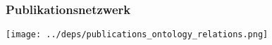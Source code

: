 \documentclass[12pt, xcolor=table]{beamer}
\begin{document}
\begin{comment}
    \begin{block}{\small{C-Rank}}
    \scriptsize{
        $sim(a,b) = 1 \quad \text{wenn } a=b$
        \newline
        sonst: \quad
        $sim(a,b)  = 
        \cfrac{c}{|L(a)||L(b)|}
        \sum_{i=1}^{|L(a)|} \sum_{j=1}^{|L(b)|} sim(L_i(a),L_j(b))$
   }
    \end{block}

\end{frame}


\begin{frame}
    \frametitle{Existierende Ähnlichkeitsmaße - zitationsbasiert III}
    \begin{block}{Weitere Beispiele}
    \begin{itemize}
        \item CC-IDF
        \item Lu et al.: Ähnlichkeit aufgrund lokaler Nachbarschaft
    \end{itemize}
    \end{block}
\end{frame}

\begin{frame}
    \frametitle{Existierende Ähnlichkeitsmaße - zitationsbasiert IV}
    \begin{block}{Nachteile}
    \begin{itemize}
        \item Gründe für das Zitieren unbekannt
    \end{itemize}
    \end{block}
\end{frame}
\end{comment}

\begin{frame}
    \frametitle{Publikationsnetzwerk}
    \begin{center}
        \texttt{[image: ../deps/publications\_ontology\_relations.png]}
    \end{center}
\end{frame}
\end{document}
